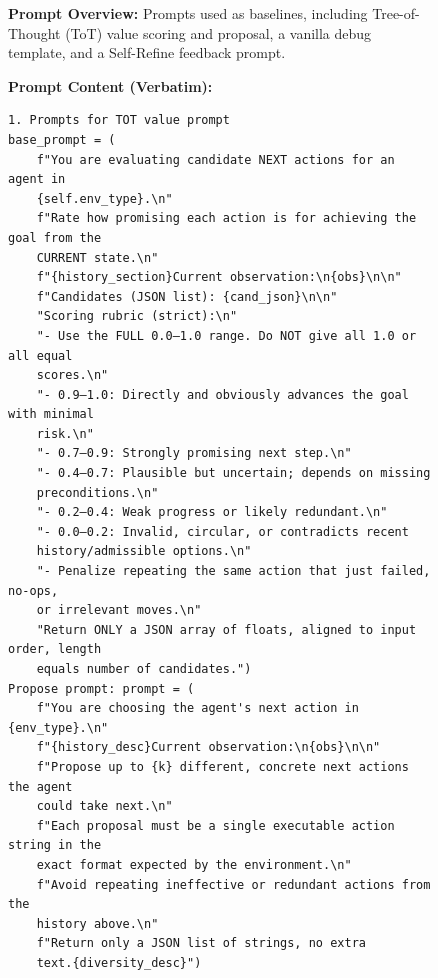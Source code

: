 



\begin{figure}[htbp]
\centering
\vspace{-8mm}
\begin{tcolorbox}[
    title=\textbf{Baseline Prompts},
    colback=yellow!1!white,
    colframe=yellow!50!black,
    fonttitle=\bfseries
]
\small

\textbf{Prompt Overview:}  
Prompts used as baselines, including Tree-of-Thought (ToT) value scoring and proposal, a vanilla debug template, and a Self-Refine feedback prompt.

\vspace{2mm}

\textbf{Prompt Content (Verbatim):}
\begin{verbatim}
1. Prompts for TOT value prompt
base_prompt = (
    f"You are evaluating candidate NEXT actions for an agent in 
    {self.env_type}.\n"
    f"Rate how promising each action is for achieving the goal from the 
    CURRENT state.\n"
    f"{history_section}Current observation:\n{obs}\n\n"
    f"Candidates (JSON list): {cand_json}\n\n"
    "Scoring rubric (strict):\n"
    "- Use the FULL 0.0–1.0 range. Do NOT give all 1.0 or all equal 
    scores.\n"
    "- 0.9–1.0: Directly and obviously advances the goal with minimal 
    risk.\n"
    "- 0.7–0.9: Strongly promising next step.\n"
    "- 0.4–0.7: Plausible but uncertain; depends on missing 
    preconditions.\n"
    "- 0.2–0.4: Weak progress or likely redundant.\n"
    "- 0.0–0.2: Invalid, circular, or contradicts recent 
    history/admissible options.\n"
    "- Penalize repeating the same action that just failed, no-ops, 
    or irrelevant moves.\n"
    "Return ONLY a JSON array of floats, aligned to input order, length 
    equals number of candidates.")
Propose prompt: prompt = (
    f"You are choosing the agent's next action in {env_type}.\n"
    f"{history_desc}Current observation:\n{obs}\n\n"
    f"Propose up to {k} different, concrete next actions the agent 
    could take next.\n"
    f"Each proposal must be a single executable action string in the 
    exact format expected by the environment.\n"
    f"Avoid repeating ineffective or redundant actions from the 
    history above.\n"
    f"Return only a JSON list of strings, no extra 
    text.{diversity_desc}")


\end{verbatim}
\end{tcolorbox}
\end{figure}
